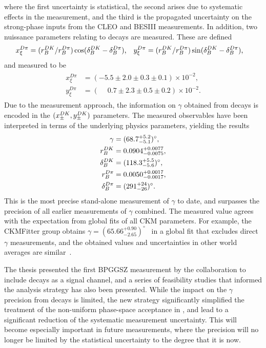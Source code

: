where the first uncertainty is statistical, the second arises due to systematic effects in the measurement, and the third is the propagated uncertainty on the strong-phase inputs from the CLEO and BESIII measurements. In addition, two nuissance parameters relating to \BtoDpi decays are measured. These are defined
\begin{align}
    x_\xi^{{D}\pi} &= (r_B^{DK}/r_B^{D\pi}) \cos (\delta_B^{DK} - \delta_B^{D\pi}), & 
    y_\xi^{{D}\pi} &= (r_B^{DK}/r_B^{D\pi}) \sin (\delta_B^{DK} - \delta_B^{D\pi}),
\end{align}
and measured to be
\begin{align}
\begin{split}
    x_\xi^{D\pi} & = (         - 5.5 \pm 2.0 \pm  0.3\pm 0.1) \times 10^{-2}, \\
    y_\xi^{D\pi} & = (\phantom{-}0.7 \pm 2.3 \pm  0.5\pm 0.2) \times 10^{-2}. 
\end{split}
\end{align}
Due to the measurement approach, the information on $\gamma$ obtained from \BtoDpi decays is encoded in the $(x_\pm^{{D}{K}}, y_\pm^{{D}{K}})$ parameters. The measured observables have been interpreted in terms of the underlying physics parameters, yielding the results
\begin{align}
\begin{split}\label{eq:phys_results}
    \gamma          &= (68.7^{+5.2}_{-5.1})^\circ, \\
    r_B^{DK}       &= 0.0904^{+0.0077}_{-0.0075}, \\
    \delta_B^{DK}  &= (118.3^{+5.5}_{-5.6})^\circ, \\
    r_B^{{D}\pi}      &= 0.0050^{+0.0017}_{-0.0017}, \\
    \delta_B^{{D}\pi} &= (291^{+24}_{-26})^\circ.
\end{split}
\end{align}
This is the most precise stand-alone measurement of $\gamma$ to date, and surpasses the precision of all earlier measurements of $\gamma$ combined. The measured value agrees with the expectation from global fits of all CKM parameters. For example, the CKMFitter group obtains  $\gamma = (65.66^{+0.90}_{-2.65})^\circ $~\cite{CKMfitter2015} in a global fit that excludes direct $\gamma$ measurements, and the obtained values and uncertainties in other world averages are similar~\cite{HFLAV,UTfit-UT}.

The thesis presented the first  BPGGSZ measurement by the \lhcb collaboration to include \BtoDpi decays as a signal channel, and a series of feasibility studies that informed the analysis strategy has also been presented. While the impact on the $\gamma$ precision from \BtoDpi decays is limited, the new strategy significantly simplified the treatment of the non-uniform phase-space acceptance in \lhcb, and lead to a significant reduction of the systematic measurement uncertainty. This will become especially important in future measurements, where the precision will no longer be limited by the statistical uncertainty to the degree that it is now.

